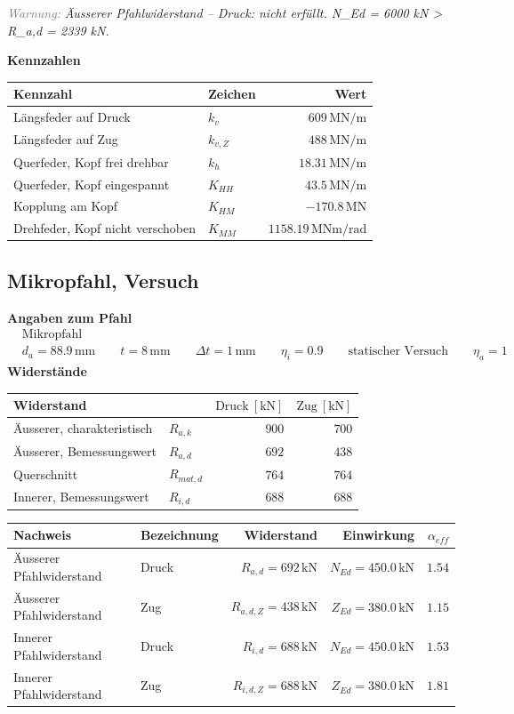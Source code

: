 \documentclass[11pt,a4paper]{article}
\newcommand{\hinweis}[2]{\par\noindent\textcolor{gray}{\textit{#1:}} \textit{#2}\par}
\begin{document}
\hinweis{Warnung}{Äusserer Pfahlwiderstand – Druck: nicht erfüllt. N\_Ed = 6000 kN > R\_a,d = 2339 kN.}
\noindent\textbf{Kennzahlen}
\begin{longtable}{llr}
\hline
Kennzahl & Zeichen & Wert \\
\hline
\endhead
Längsfeder auf Druck & $k_v$ & $609\,\mathrm{MN}/\mathrm{m}$ \\
Längsfeder auf Zug & $k_{v,Z}$ & $488\,\mathrm{MN}/\mathrm{m}$ \\
Querfeder, Kopf frei drehbar & $k_h$ & $18.31\,\mathrm{MN}/\mathrm{m}$ \\
Querfeder, Kopf eingespannt & $K_{HH}$ & $43.5\,\mathrm{MN}/\mathrm{m}$ \\
Kopplung am Kopf & $K_{HM}$ & $-170.8\,\mathrm{MN}$ \\
Drehfeder, Kopf nicht verschoben & $K_{MM}$ & $1158.19\,\mathrm{MNm}/\mathrm{rad}$ \\
\hline
\end{longtable}
\subsection{Mikropfahl, Versuch}
\noindent\textbf{Angaben zum Pfahl}
\begin{equation*}
\begin{aligned} & \text{Mikropfahl} \\ & d_a = 88.9\,\mathrm{mm} \qquad t = 8\,\mathrm{mm} \qquad \Delta t = 1\,\mathrm{mm} \qquad \eta_i = 0.9 \qquad \text{statischer Versuch} \qquad \eta_a = 1 \end{aligned}
\end{equation*}
\noindent\textbf{Widerstände}
\begin{longtable}{llrr}
\hline
Widerstand &  & $\text{Druck}\ [\mathrm{kN}]$ & $\text{Zug}\ [\mathrm{kN}]$ \\
\hline
\endhead
Äusserer, charakteristisch & $R_{a,k}$ & $900$ & $700$ \\
Äusserer, Bemessungswert & $R_{a,d}$ & $692$ & $438$ \\
Querschnitt & $R_{mat,d}$ & $764$ & $764$ \\
Innerer, Bemessungswert & $R_{i,d}$ & $688$ & $688$ \\
\hline
\end{longtable}
\begin{xltabular}{\linewidth}{>{\raggedright\arraybackslash}X>{\raggedright\arraybackslash}Xrrr}
\hline
Nachweis & Bezeichnung & Widerstand & Einwirkung & $\alpha_{eff}$ \\
\hline
\endhead
Äusserer Pfahlwiderstand & Druck & $R_{a,d} = 692\,\mathrm{kN}$ & $N_{Ed} = 450.0\,\mathrm{kN}$ & $1.54$ \\
Äusserer Pfahlwiderstand & Zug & $R_{a,d,Z} = 438\,\mathrm{kN}$ & $Z_{Ed} = 380.0\,\mathrm{kN}$ & $1.15$ \\
Innerer Pfahlwiderstand & Druck & $R_{i,d} = 688\,\mathrm{kN}$ & $N_{Ed} = 450.0\,\mathrm{kN}$ & $1.53$ \\
Innerer Pfahlwiderstand & Zug & $R_{i,d,Z} = 688\,\mathrm{kN}$ & $Z_{Ed} = 380.0\,\mathrm{kN}$ & $1.81$ \\
\hline
\end{xltabular}
\end{document}
